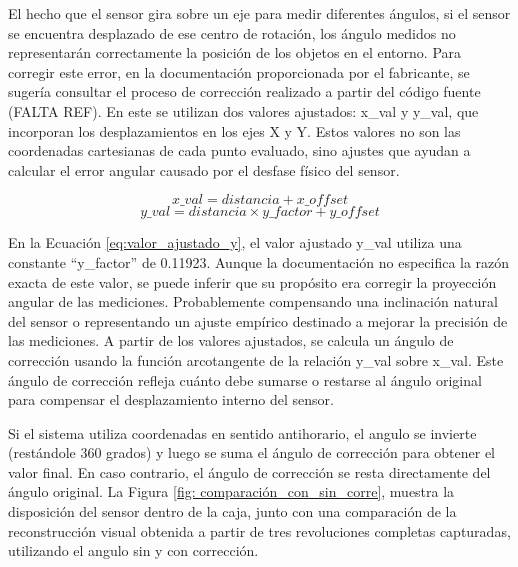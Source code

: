El hecho que el sensor gira sobre un eje para medir diferentes ángulos, si el sensor se encuentra desplazado de ese centro de rotación, los ángulo medidos no representarán correctamente la posición de los objetos en el entorno. Para corregir este error, en la documentación proporcionada por el fabricante, se sugería consultar el proceso de corrección realizado a partir del código fuente (FALTA REF). En este se utilizan dos valores ajustados: x\_val y y\_val, que incorporan los desplazamientos en los ejes X y Y. Estos valores no son las coordenadas cartesianas de cada punto evaluado, sino ajustes que ayudan a calcular el error angular causado por el desfase físico del sensor. 

\begin{equation}
	\label{eq:valor_ajustado_x}
	x\_val = distancia + x\_offset
\end{equation}
\begin{equation}
	\label{eq:valor_ajustado_y}
	y\_val = distancia\times y\_factor + y\_offset
\end{equation}

En la Ecuación \ref{eq:valor_ajustado_y}, el valor ajustado y\_val utiliza una constante  ``y\_factor'' de 0.11923. Aunque la documentación no especifica la razón exacta de este valor, se puede inferir que su propósito era corregir la proyección angular de las mediciones. Probablemente compensando una inclinación natural del sensor o representando un ajuste empírico destinado a mejorar la precisión de las mediciones. A partir de los valores ajustados, se calcula un ángulo de corrección usando la función arcotangente de la relación y\_val sobre x\_val. Este ángulo de corrección refleja cuánto debe sumarse o restarse al ángulo original para compensar el desplazamiento interno del sensor. 

Si el sistema utiliza coordenadas en sentido antihorario, el angulo se invierte (restándole 360 grados) y luego se suma el ángulo de corrección para obtener el valor final. En caso contrario, el ángulo de corrección se resta directamente del ángulo original. La Figura \ref{fig: comparación_con_sin_corre}, muestra la disposición del sensor dentro de la caja, junto con una comparación de la reconstrucción visual obtenida a partir de tres revoluciones completas capturadas, utilizando el angulo sin y con corrección.

